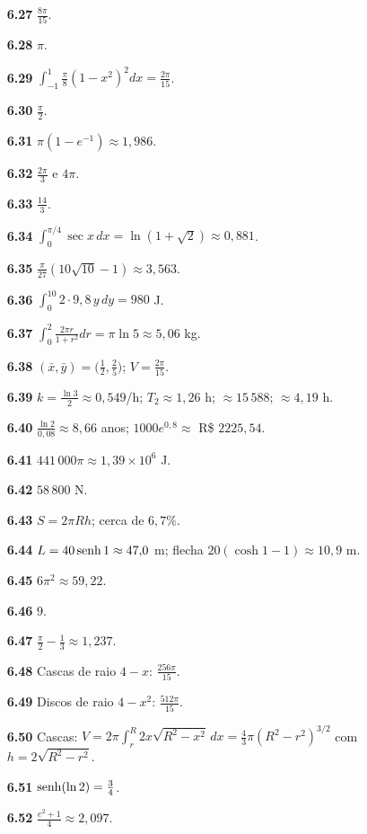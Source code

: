 {\begin{multicols}{2}
\begin{itemize}[leftmargin=2.7em,labelsep=0.5em,itemsep=1pt]
\item[\textbf{6.27}] $\tfrac{8\pi}{15}$.
\item[\textbf{6.28}] $\pi$.
\item[\textbf{6.29}] $\int_{-1}^1\tfrac\pi8(1-x^2)^2dx=\tfrac{2\pi}{15}$.
\item[\textbf{6.30}] $\tfrac\pi2$.
\item[\textbf{6.31}] $\pi(1-e^{-1})\approx1{,}986$.
\item[\textbf{6.32}] $\tfrac{2\pi}3$ e $4\pi$.
\item[\textbf{6.33}] $\tfrac{14}3$.
\item[\textbf{6.34}] $\int_0^{\pi/4}\sec x\,dx=\ln(1+\sqrt2)\approx0{,}881$.
\item[\textbf{6.35}] $\tfrac\pi{27}(10\sqrt{10}-1)\approx3{,}563$.
\item[\textbf{6.36}] $\int_0^{10}2\cdot9{,}8\,y\,dy=980$ J.
\item[\textbf{6.37}] $\int_0^2\tfrac{2\pi r}{1+r^2}dr=\pi\ln5\approx5{,}06$ kg.
\item[\textbf{6.38}] $(\bar x,\bar y)=\big(\tfrac12,\tfrac25\big)$; $V=\tfrac{2\pi}{15}$.
\item[\textbf{6.39}] $k=\tfrac{\ln3}2\approx0{,}549$/h; $T_2\approx1{,}26$ h; $\approx15\,588$; $\approx4{,}19$ h.
\item[\textbf{6.40}] $\tfrac{\ln2}{0{,}08}\approx8{,}66$ anos; $1000e^{0{,}8}\approx$ R\$ $2225{,}54$.
\item[\textbf{6.41}] $441\,000\pi\approx1{,}39\times10^6$ J.
\item[\textbf{6.42}] $58\,800$ N.
\item[\textbf{6.43}] $S=2\pi Rh$; cerca de $6{,}7\%$.
\item[\textbf{6.44}] $L=40\operatorname{senh}1\approx47{,}0$ m; flecha $20(\cosh1-1)\approx10{,}9$ m.
\item[\textbf{6.45}] $6\pi^2\approx59{,}22$.
\item[\textbf{6.46}] $9$.
\item[\textbf{6.47}] $\tfrac\pi2-\tfrac13\approx1{,}237$.
\item[\textbf{6.48}] Cascas de raio $4-x$: $\tfrac{256\pi}{15}$.
\item[\textbf{6.49}] Discos de raio $4-x^2$: $\tfrac{512\pi}{15}$.
\item[\textbf{6.50}] Cascas: $V=2\pi\int_r^R2x\sqrt{R^2-x^2}\,dx=\tfrac43\pi(R^2-r^2)^{3/2}$ com $h=2\sqrt{R^2-r^2}$.
\item[\textbf{6.51}] $\operatorname{senh}(\ln2)=\tfrac34$.
\item[\textbf{6.52}] $\tfrac{e^2+1}4\approx2{,}097$.

\end{itemize}
\end{multicols}}
